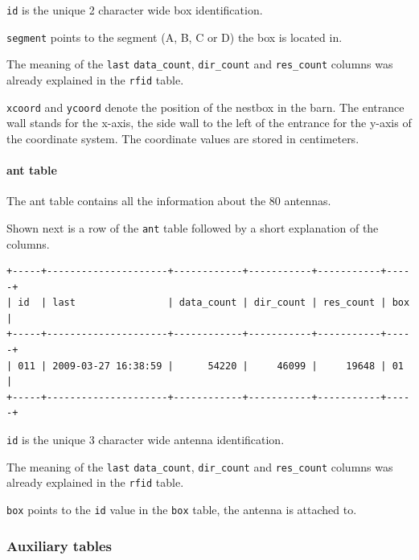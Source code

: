 \begin{mydesc}
	\item \lstinline|id| is the unique 2 character wide box identification.
	\item \lstinline|segment| points to the segment (A, B, C or D) the box is located in.
	\item The meaning of the \lstinline|last| \lstinline|data_count|, \lstinline|dir_count| and \lstinline|res_count| columns was already explained in the \lstinline|rfid| table.
	\item \lstinline|xcoord| and \lstinline|ycoord| denote the position of the nestbox in the barn. The entrance wall stands for the x-axis, the side wall to the left of the entrance for the y-axis of the coordinate system. The coordinate values are stored in centimeters. 
\end{mydesc}

\paragraph{ant table}
\label{para:ant_table}

The ant table contains all the information about the 80 antennas. 

Shown next is a row of the \lstinline|ant| table followed by a short explanation of the columns.
\codescript
\begin{lstlisting}[frame=none]
+-----+---------------------+------------+-----------+-----------+-----+
| id  | last                | data_count | dir_count | res_count | box |
+-----+---------------------+------------+-----------+-----------+-----+
| 011 | 2009-03-27 16:38:59 |      54220 |     46099 |     19648 | 01  | 
+-----+---------------------+------------+-----------+-----------+-----+

\end{lstlisting}

\begin{mydesc}
	\item \lstinline|id| is the unique 3 character wide antenna identification.
	\item The meaning of the \lstinline|last| \lstinline|data_count|, \lstinline|dir_count| and \lstinline|res_count| columns was already explained in the \lstinline|rfid| table.
	\item \lstinline|box| points to the \lstinline|id| value in the \lstinline|box| table, the antenna is attached to.
\end{mydesc}

\subsubsection{Auxiliary tables}

